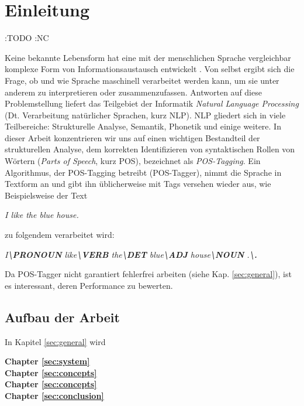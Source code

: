 %
\chapter{Einleitung}
\label{sec:intro}


:TODO :NC

Keine bekannte Lebensform hat eine mit der menschlichen Sprache vergleichbar komplexe Form von Informationsaustausch entwickelt \cite{Rao:2018}. Von selbst ergibt sich die Frage, ob und wie Sprache maschinell verarbeitet werden kann, um sie unter anderem zu interpretieren oder zusammenzufassen. Antworten auf diese Problemstellung liefert das Teilgebiet der Informatik \textit{Natural Language Processing} (Dt. Verarbeitung natürlicher Sprachen, kurz NLP). NLP gliedert sich in viele Teilbereiche: Strukturelle Analyse, Semantik, Phonetik und einige weitere. In dieser Arbeit konzentrieren wir uns auf einen wichtigen Bestandteil der strukturellen Analyse, dem korrekten Identifizieren von syntaktischen Rollen von Wörtern (\textit{Parts of Speech}, kurz POS), bezeichnet als \textit{POS-Tagging}.
\newline
Ein Algorithmus, der POS-Tagging betreibt (POS-Tagger), nimmt die Sprache in Textform an und gibt ihn üblicherweise mit Tags versehen wieder aus, wie Beispielsweise der Text
\newline \newline
\centerline{\textit{I like the blue house.}}
	
 zu folgendem verarbeitet wird:
\newline \newline
\centerline{\textit{I\textbf{\textbackslash PRONOUN} like\textbf{\textbackslash VERB} the\textbf{\textbackslash DET} blue\textbf{\textbackslash ADJ} house\textbf{\textbackslash NOUN} .\textbf{\textbackslash .}}}

Da POS-Tagger nicht garantiert fehlerfrei arbeiten (siehe Kap. \ref{sec:general}), ist es interessant, deren Performance zu bewerten.


\section{Aufbau der Arbeit}
\label{sec:intro:structure}

In Kapitel \ref{sec:general} wird %

\textbf{Chapter \ref{sec:system}} \\[0.2em]


\textbf{Chapter \ref{sec:concepts}} \\[0.2em]


\textbf{Chapter \ref{sec:concepts}} \\[0.2em]


\textbf{Chapter \ref{sec:conclusion}} \\[0.2em]

